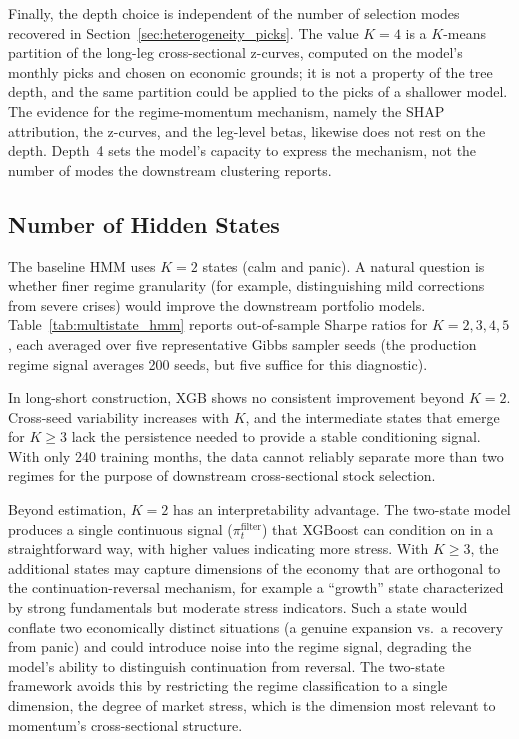 Finally, the depth choice is independent of the number of selection modes recovered in Section~\ref{sec:heterogeneity_picks}. The value $K=4$ is a $K$-means partition of the long-leg cross-sectional z-curves, computed on the model's monthly picks and chosen on economic grounds; it is not a property of the tree depth, and the same partition could be applied to the picks of a shallower model. The evidence for the regime-momentum mechanism, namely the SHAP attribution, the z-curves, and the leg-level betas, likewise does not rest on the depth. Depth~4 sets the model's capacity to express the mechanism, not the number of modes the downstream clustering reports.

\subsection{Number of Hidden States}\label{app:num_states}

The baseline HMM uses $K = 2$ states (calm and panic). A natural question is whether finer regime granularity (for example, distinguishing mild corrections from severe crises) would improve the downstream portfolio models. Table~\ref{tab:multistate_hmm} reports out-of-sample Sharpe ratios for $K = 2, 3, 4, 5$, each averaged over five representative Gibbs sampler seeds (the production regime signal averages 200 seeds, but five suffice for this diagnostic).



In long-short construction, XGB shows no consistent improvement beyond $K = 2$. Cross-seed variability increases with $K$, and the intermediate states that emerge for $K \geq 3$ lack the persistence needed to provide a stable conditioning signal. With only 240 training months, the data cannot reliably separate more than two regimes for the purpose of downstream cross-sectional stock selection.

Beyond estimation, $K = 2$ has an interpretability advantage. The two-state model produces a single continuous signal ($\pi_t^{\text{filter}}$) that XGBoost can condition on in a straightforward way, with higher values indicating more stress. With $K \geq 3$, the additional states may capture dimensions of the economy that are orthogonal to the continuation-reversal mechanism, for example a ``growth'' state characterized by strong fundamentals but moderate stress indicators. Such a state would conflate two economically distinct situations (a genuine expansion vs.\ a recovery from panic) and could introduce noise into the regime signal, degrading the model's ability to distinguish continuation from reversal. The two-state framework avoids this by restricting the regime classification to a single dimension, the degree of market stress, which is the dimension most relevant to momentum's cross-sectional structure.

